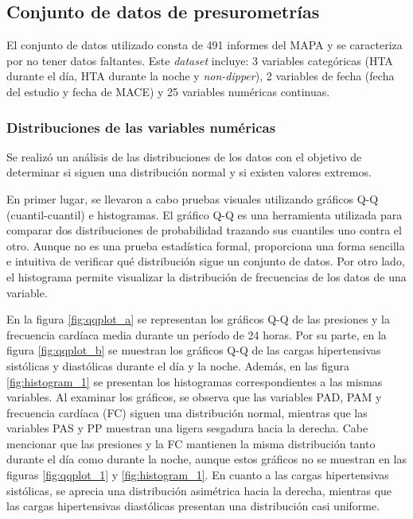 \subsection{Conjunto de datos de presurometrías}
\label{sec:Conjunto1}

El conjunto de datos utilizado consta de 491 informes del MAPA y se caracteriza por no tener datos faltantes. 
Este \emph{dataset} incluye: 3 variables categóricas (HTA durante el día, HTA durante la noche y \emph{non-dipper}), 
2 variables de fecha (fecha del estudio y fecha de MACE) y 25 variables numéricas continuas.


\subsubsection{Distribuciones de las variables numéricas}
Se realizó un análisis de las distribuciones de los datos con el objetivo de determinar si siguen una distribución 
normal y si existen valores extremos. 

En primer lugar, se llevaron a cabo pruebas visuales utilizando gráficos Q-Q 
(cuantil-cuantil) e histogramas. El gráfico Q-Q es una herramienta utilizada para comparar dos distribuciones de 
probabilidad trazando sus cuantiles uno contra el otro. Aunque no es una prueba estadística formal, proporciona 
una forma sencilla e intuitiva de verificar qué distribución sigue un conjunto de datos. Por otro lado, el 
histograma permite visualizar la distribución de frecuencias de los datos de una variable. 

En la figura \ref{fig:qqplot_a} se representan los gráficos Q-Q de las presiones y la frecuencia cardíaca 
media durante un período de 24 horas. Por su parte, en la figura \ref{fig:qqplot_b} se muestran los 
gráficos Q-Q de las cargas hipertensivas sistólicas y diastólicas durante el día y la noche. Además, en 
las figura \ref{fig:histogram_1} se presentan los histogramas correspondientes a las mismas variables.
Al examinar los gráficos, se observa que las variables PAD, PAM y frecuencia cardíaca (FC) siguen una 
distribución normal, mientras que las variables PAS y PP muestran una ligera sesgadura hacia la derecha. 
Cabe mencionar que las presiones y la FC mantienen la misma distribución tanto durante el día como durante 
la noche, aunque estos gráficos no se muestran en las figuras \ref{fig:qqplot_1} y \ref{fig:histogram_1}.
En cuanto a las cargas hipertensivas sistólicas, se aprecia una distribución asimétrica hacia la derecha, 
mientras que las cargas hipertensivas diastólicas presentan una distribución casi uniforme.

